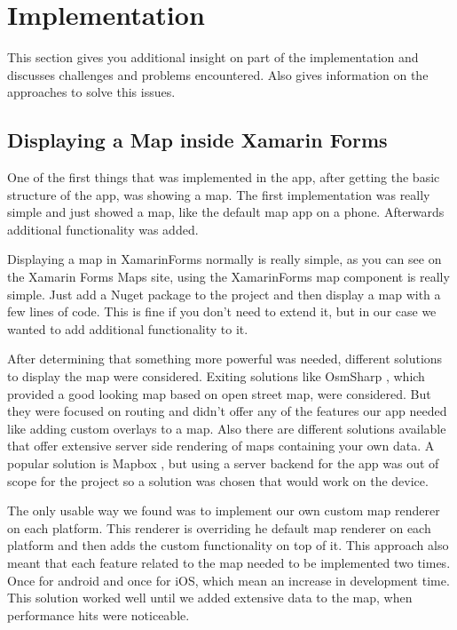 \section{Implementation}
This section gives you additional insight on part of the implementation and discusses challenges and problems encountered. Also gives information on the approaches to solve this issues.

\subsection{Displaying a Map inside Xamarin Forms}
One of the first things that was implemented in the app, after getting the basic structure of the app, was showing a map. The first implementation was really simple and just showed a map, like the default map app on a phone. Afterwards additional functionality was added.

Displaying a map in \gls{XamarinForms} normally is really simple, as you can see on the Xamarin Forms Maps \cite{xamMaps} site, using the \gls{XamarinForms} map component is really simple. Just add a \gls{Nuget} package to the project and then display a map with a few lines of code. This is fine if you don't need to extend it, but in our case we wanted to add additional functionality to it.

After determining that something more powerful was needed, different solutions to display the map were considered. Exiting solutions like 
OsmSharp \cite{osmsharp}, which provided a good looking map based on open street map, were considered. But they were focused on routing and didn't offer any of the features our app needed like adding custom \glspl{overlay} to a map.
Also there are different solutions available that offer extensive server side rendering of maps containing your own data. A popular solution is Mapbox \cite{mapbox}, but using a server backend for the app was out of scope for the project so a solution was chosen that would work on the device.

The only usable way we found was to implement our own custom map \gls{renderer} on each platform. This \gls{renderer} is overriding he default map \gls{renderer} on each platform and then adds the custom functionality on top of it. This approach also meant that each feature related to the map needed to be implemented two times. Once for android and once for iOS, which mean an increase in development time. This solution worked well until we added extensive data to the map, when performance hits were noticeable.

